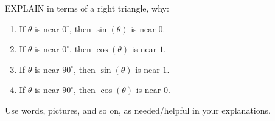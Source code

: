 \documentclass[noauthor,nooutcomes,12pt]{ximera}
\begin{document}
\begin{question}
  EXPLAIN in terms of a right triangle, why:
  \begin{enumerate}
  \item If $\theta$ is near $0^\circ$, then $\sin(\theta)$ is near $0$.
  \item If $\theta$ is near $0^\circ$, then $\cos(\theta)$ is near $1$.
  \item If $\theta$ is near $90^\circ$, then $\sin(\theta)$ is near $1$.
  \item If $\theta$ is near $90^\circ$, then $\cos(\theta)$ is near $0$.
  \end{enumerate}
  Use words, pictures, and so on, as needed/helpful in your
  explanations.
        
        
        

\end{question}
\end{document}
